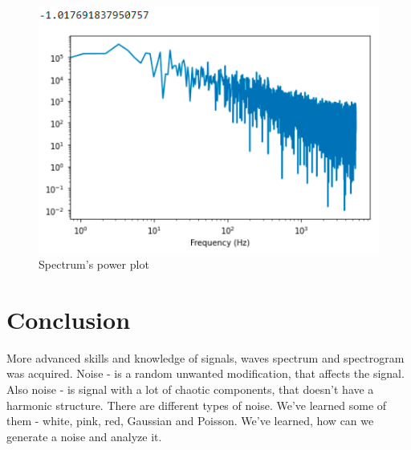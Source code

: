 \documentclass[a4paper]{article}
\begin{document}
            \begin{figure}[H]
                \centering
                \includegraphics[width=\textwidth]{img/vvos_power.png}
                \caption{Spectrum's power plot}
                \label{fig:part5_1}
            \end{figure}
    
    \newpage
        \section{Conclusion}
            More advanced skills and knowledge of signals, waves spectrum and spectrogram was acquired. Noise - is a random unwanted modification, that affects the signal. Also noise - is signal with a lot of chaotic components, that doesn't have a harmonic structure. There are different types of noise. We've learned some of them - white, pink, red, Gaussian and Poisson. We've learned, how can we generate a noise and analyze it.
     
\end{document}
